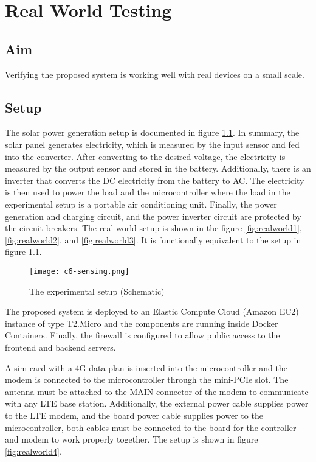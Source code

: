 \documentclass[../thesis.tex]{subfiles}
\begin{document}
\chapter{Real World Testing}
\label{chap:rw}

\section{Aim}

Verifying the proposed system is working well with real devices on a small scale.

\section{Setup} %

The solar power generation setup is documented in figure \ref{fig:realworldsensing}. In summary, the solar panel generates electricity, which is measured by the input sensor and fed into the converter. After converting to the desired voltage, the electricity is measured by the output sensor and stored in the battery. Additionally, there is an inverter that converts the DC electricity from the battery to AC. The electricity is then used to power the load and the microcontroller where the load in the experimental setup is a portable air conditioning unit. Finally, the power generation and charging circuit, and the power inverter circuit are protected by the circuit breakers. The real-world setup is shown in the figure \ref{fig:realworld1}, \ref{fig:realworld2}, and \ref{fig:realworld3}. It is functionally equivalent to the setup in figure \ref{fig:realworldsensing}.

\begin{figure}[!ht]
\centering
\texttt{[image: c6-sensing.png]}
\caption{The experimental setup (Schematic)}
\label{fig:realworldsensing}
\end{figure}

The proposed system is deployed to an Elastic Compute Cloud (Amazon EC2) instance of type T2.Micro and the components are running inside Docker Containers. Finally, the firewall is configured to allow public access to the frontend and backend servers.

A sim card with a 4G data plan is inserted into the microcontroller and the modem is connected to the microcontroller through the mini-PCIe slot. The antenna must be attached to the MAIN connector of the modem to communicate with any LTE base station. Additionally, the external power cable supplies power to the LTE modem, and the board power cable supplies power to the microcontroller, both cables must be connected to the board for the controller and modem to work properly together. The setup is shown in figure \ref{fig:realworld4}.
\end{document}
